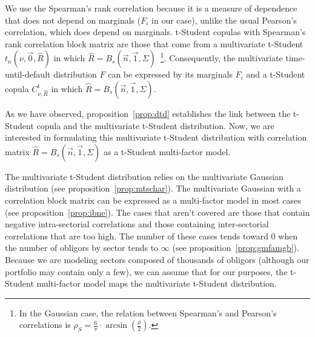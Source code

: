 \documentclass[11pt,fleqn]{book} %
\begin{document}
We use the Spearman's rank correlation because it is a measure of dependence 
that does not depend on marginals ($F_i$ in our case), unlike the usual
Pearson's correlation, which does depend on marginals. t-Student copulas 
with Spearman's rank correlation block matrix are those that come from a 
multivariate t-Student $t_n(\nu,\vec{0},\widehat{R})$ in which 
$\widehat{R} = B_s(\vec{n},\vec{1},\Sigma)$~\footnote{ In the Gaussian case, 
the relation between Spearman's and Pearson's correlations is 
$\rho_S = \frac{6}{\pi}\cdot \arcsin(\frac{\rho}{2})$.}. Consequently, 
the multivariate time-until-default distribution $F$ can be expressed by 
its marginals $F_i$ and a t-Student copula $C_{\nu,\widehat{R}}^{\text{t}}$ 
in which $\widehat{R} = B_s(\vec{n},\vec{1},\Sigma)$.

As we have observed, proposition~\ref{prop:dtd} establishes the link between 
the t-Student copula and the multivariate t-Student distribution. Now, we are
interested in formulating this multivariate t-Student distribution with 
correlation matrix $\widehat{R} = B_s(\vec{n},\vec{1},\Sigma)$ as a t-Student 
multi-factor model.

The multivariate t-Student distribution relies on the multivariate Gaussian
distribution (see proposition~\ref{prop:mtschar}). The multivariate Gaussian 
with a correlation block matrix can be expressed as a multi-factor model in 
most cases (see proposition~\ref{prop:ibne}). The cases that aren't covered 
are those that contain negative intra-sectorial correlations and those 
containing inter-sectorial correlations that are too high. The number of these 
cases tends toward $0$ when the number of obligors by sector tends to $\infty$ 
(see proposition~\ref{prop:gmfamgb}). Because we are modeling sectors composed 
of thousands of obligors (although our portfolio may contain only a few), we 
can assume that for our purposes, the t-Student multi-factor model maps the 
multivariate t-Student distribution.
\end{document}
